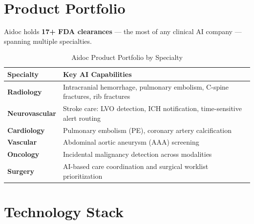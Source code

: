 \documentclass[12pt,a4paper]{article}
\begin{document}
\section{Product Portfolio}

Aidoc holds \textbf{17+ FDA clearances} --- the most of any clinical AI company --- spanning multiple specialties.

\begin{table}[H]\centering\renewcommand{\arraystretch}{1.3}
\begin{tabularx}{\textwidth}{lX}\toprule
\textbf{Specialty} & \textbf{Key AI Capabilities}\\\midrule
\textbf{Radiology}     & Intracranial hemorrhage, pulmonary embolism, C-spine fractures, rib fractures \\
\textbf{Neurovascular} & Stroke care: LVO detection, ICH notification, time-sensitive alert routing \\
\textbf{Cardiology}    & Pulmonary embolism (PE), coronary artery calcification \\
\textbf{Vascular}      & Abdominal aortic aneurysm (AAA) screening \\
\textbf{Oncology}      & Incidental malignancy detection across modalities \\
\textbf{Surgery}       & AI-based care coordination and surgical worklist prioritization \\
\bottomrule\end{tabularx}\caption{Aidoc Product Portfolio by Specialty}\end{table}

\section{Technology Stack}
\end{document}
